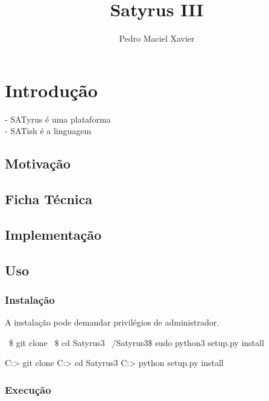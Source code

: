 \documentclass[12pt]{satyrus}
\title{Satyrus III}
\author{Pedro Maciel Xavier}
\begin{document}
    \maketitle
    
    \newpage

    \tableofcontents

    \chapter{Introdução}
    
    - SATyrus é uma plataforma\\
    - SATish é a linguagem\\
    
    \section{Motivação}

    \section{Ficha Técnica}

    \section{Implementação}

    \section{Uso}
    
    \subsection{Instalação}
    
    A instalação pode demandar privilégios de administrador.
    
	\begin{bash}
	~$\text{\$}$ git clone
	~$\text{\$}$ cd Satyrus3
	~/Satyrus3$\text{\$}$ sudo python3 setup.py install
	\end{bash}
	
	\begin{shell}
	C:\Users\User> git clone
	C:\Users\User> cd Satyrus3
	C:\Users\User{}> python setup.py install
	\end{shell}

    \subsection{Execução}
    
\end{document}
